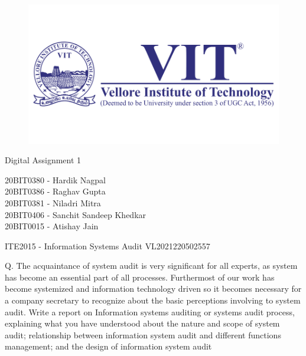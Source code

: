 \documentclass[12pt]{article}
\begin{document}
\begin{titlepage}
\NoBgThispage
   \begin{center}
        \begin{figure}[h] %
        \centering
        \includegraphics[width=15cm]{1583124354phpJTtnK5.png}
        \end{figure}

        \Huge{Digital Assignment 1}

        \vspace{0.5cm}
        \LARGE{20BIT0380 - Hardik Nagpal\\20BIT0386 - Raghav Gupta\\20BIT0381 - Niladri Mitra\\20BIT0406 - Sanchit Sandeep Khedkar\\20BIT0015 - Atishay Jain}
       
        \vspace{2.5 cm}

        \vspace{0.25 cm}
        \Large{ITE2015 - Information Systems Audit}
        \large{VL2021220502557}
       

       \vfill
    \end{center}
\end{titlepage}
\newpage
Q. The acquaintance of system audit is very significant for all experts, as system has become an essential part of all processes. Furthermost of our work has become systemized and information technology driven so it becomes necessary for a company secretary to recognize about the basic perceptions involving to system audit.
Write a report on Information systems auditing or systems audit process, explaining what you have understood about the nature and scope of system audit; relationship between information system audit and different functions management; and the design of information system audit
\end{document}
